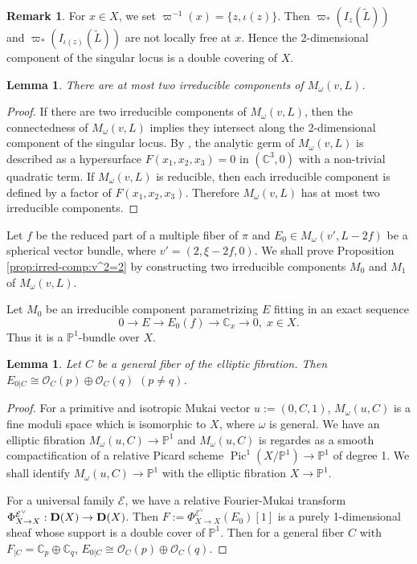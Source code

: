 \documentclass[leqno,11pt]{amsart}
\def\C{\ensuremath{\mathbb{C}}}
\def\P{\ensuremath{\mathbb{P}}}
\def\Pic{\mathop{\mathrm{Pic}}\nolimits}
\newtheorem{Lem}[Thm]{Lemma}
\theoremstyle{definition}
\newtheorem{Rem}[Thm]{Remark}
\def\C{\ensuremath{\mathbb{C}}}
\def\P{\ensuremath{\mathbb{P}}}
\def\EE{\ensuremath{\mathcal E}}
\def\OO{\ensuremath{\mathcal O}}
\begin{document}
\begin{Rem}
For $x \in X$, we set $\varpi^{-1}(x)=\{z,\iota(z)\}$.
Then $\varpi_*(I_z(\widetilde{L}))$ and 
$\varpi_*(I_{\iota(z)}(\widetilde{L}))$
are not locally free at $x$.
Hence the 2-dimensional component of the singular locus
is a double covering of $X$. 
\end{Rem}





\begin{Lem}\label{lem:irred-comp-2}
There are at most two irreducible components of
$M_\omega(v,L)$.
\end{Lem}

\begin{proof}
If there are two irreducible components of $M_\omega(v,L)$, then
the connectedness of $M_\omega(v,L)$ implies they intersect along 
the 2-dimensional component of the singular locus. 
By \cite{Yamada},
the analytic germ of $M_\omega(v,L)$ is described as a hypersurface
$F(x_1,x_2,x_3)=0$ in $(\C^3,0)$ with a non-trivial quadratic term. 
If $M_\omega(v,L)$ is reducible, then each irreducible component is defined
by a factor of $F(x_1,x_2,x_3)$.
Therefore $M_\omega(v,L)$ has at most two irreducible components.
\end{proof}

Let $f$ be the reduced part of a multiple fiber of $\pi$ and
$E_0 \in M_\omega(v',L-2f)$ be a spherical vector bundle,
where $v'=(2,\xi-2f,0)$.
We shall prove Proposition \ref{prop:irred-comp:v^2=2}
by constructing two irreducible components $M_0$ and $M_1$
of $M_\omega(v,L)$. 

Let $M_0$ be an irreducible component
parametrizing $E$ fitting in an exact sequence
\begin{equation}
0 \to E \to E_0(f) \to \C_x \to 0, \; x \in X.
\end{equation}
Thus it is a $\P^1$-bundle over $X$.




\begin{Lem}
Let $C$ be a general fiber of the elliptic fibration.
Then $E_{0|C} \cong \OO_C(p) \oplus \OO_C(q)$ $(p \ne q)$.
\end{Lem}

\begin{proof}
For a primitive and isotropic Mukai vector $u:=(0,C,1)$,  
$M_\omega(u,C)$ is a fine moduli space
which is isomorphic to $X$, where $\omega$ is general.
We have an elliptic fibration $M_\omega(u,C) \to \P^1$ and
$M_\omega(u,C)$ is regardes as a smooth compactification of a relative 
Picard scheme $\Pic^1(X/\P^1) \to \P^1$ of degree 1.
We shall identify $M_\omega(u,C) \to \P^1$ with
the elliptic fibration $X \to \P^1$.

For a universal family $\EE$, we have a relative Fourier-Mukai transform
$\Phi_{X \to X}^{\EE^{\vee}}: {\bf D}(X) \to {\bf D}(X)$.
Then $F:=\Phi_{X \to X}^{\EE^{\vee}}(E_0)[1]$ is a purely 1-dimensional sheaf
whose support is a double cover of $\P^1$.
Then for a general fiber $C$ with $F_{|C}=\C_p \oplus \C_q$,
$E_{0|C} \cong \OO_C(p) \oplus \OO_C(q)$.
\end{proof}
\end{document}
